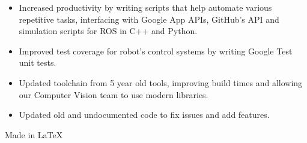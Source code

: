 \documentclass[10pt,a4paper,ragged2e,academicons]{altacv}
\begin{document}
\begin{paracol}{2}
  \begin{itemize}
    \item Increased productivity by writing scripts that help automate various repetitive tasks, interfacing with Google App APIs, GitHub’s API and simulation scripts for ROS in C++ and Python.
    \item Improved test coverage for robot’s control systems by writing Google Test unit tests.
    \item Updated toolchain from 5 year old tools, improving build times and allowing our Computer Vision team to use modern libraries.
    \item Updated old and undocumented code to fix issues and add features.
  \end{itemize}
  \divider\small

  \vspace*{\fill}
  \hfill\tiny{Made in \LaTeX}
\end{paracol}
\end{document}
